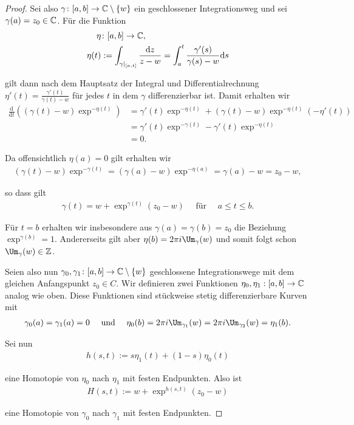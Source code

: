 \begin{proof}
 Sei also \(\gamma \colon [a,b] \rightarrow \mathbb{C} \setminus \{w\}\) ein geschlossener Integrationsweg und sei \(\gamma(a) = z_0 \in \mathbb{C}\).
Für die Funktion
\begin{align*}
\eta &\colon [a,b] \rightarrow \mathbb{C}, \\
\eta(t) &:= \int_{\gamma|_{[a,t]}} \frac{\mathrm{d}z}{z-w} = \int_a^t \frac{\gamma'(s)}{\gamma(s) - w} \mathrm{d}s\end{align*}
\par
gilt dann nach dem Hauptsatz der Integral  und Differentialrechnung \(\eta'(t) = \frac{\gamma'(t)}{\gamma(t)-w}\) für jedes \(t\) in dem \(\gamma\) differenzierbar ist.
Damit erhalten wir
\begin{align*}
\frac{\mathrm{d}}{\mathrm{d}t} \left( (\gamma(t) - w)\exp^{-\eta(t)}\right) &= \gamma'(t)\exp^{-\eta(t)} + (\gamma(t) - w)\exp^{-\eta(t)}(-\eta'(t))\\
&= \gamma'(t)\exp^{-\gamma(t)} - \gamma'(t)\exp^{-\eta(t)}\\
&= 0.
\end{align*}
\par
Da offensichtlich \(\eta(a) = 0\) gilt erhalten wir
\begin{align*}
(\gamma(t) - w)\exp^{-\gamma(t)} = (\gamma(a) - w)\exp^{-\eta(a)} = \gamma(a) - w = z_0 - w,
\end{align*}
\par
so dass gilt
\begin{align*}
\gamma(t) = w + \exp^{\gamma(t)}(z_0 - w) \quad \text{ für } \quad a \leq t \leq b.
\end{align*}
\par
Für \(t = b\) erhalten wir insbesondere aus \(\gamma(a) = \gamma(b) = z_0\) die Beziehung \(\exp^{\gamma(b)} = 1\).
Andererseits gilt aber \(\eta(b) = 2\pi i \Um_\gamma(w)\) und somit folgt schon \(\Um_\gamma(w) \in \Z\).

\par
Seien also nun \(\gamma_0, \gamma_1 \colon [a,b] \rightarrow \mathbb{C} \setminus \{w\}\) geschlossene Integrationswege mit dem gleichen Anfangspunkt \(z_0 \in C\).
Wir definieren zwei Funktionen \(\eta_0, \eta_1 : [a,b] \rightarrow \mathbb{C}\) analog wie oben.
Diese Funktionen sind stückweise stetig differenzierbare Kurven mit
\begin{align*}
\gamma_0(a) = \gamma_1(a) = 0 \quad \text{ und } \quad \eta_0(b) = 2 \pi i \Um_{\gamma_1}(w) = 2 \pi i \Um_{\gamma_2}(w) = \eta_1(b).
\end{align*}
\par
Sei nun
\begin{align*}
h(s,t) := s \eta_1(t) + (1-s) \eta_0(t)
\end{align*}
\par
eine Homotopie von \(\eta_0\) nach \(\eta_1\) mit festen Endpunkten.
Also ist
\begin{align*}
H(s,t) := w + \exp^{h(s,t)}(z_0 - w)
\end{align*}
\par
eine Homotopie von \(\gamma_0\) nach \(\gamma_1\) mit festen Endpunkten.
\end{proof}

